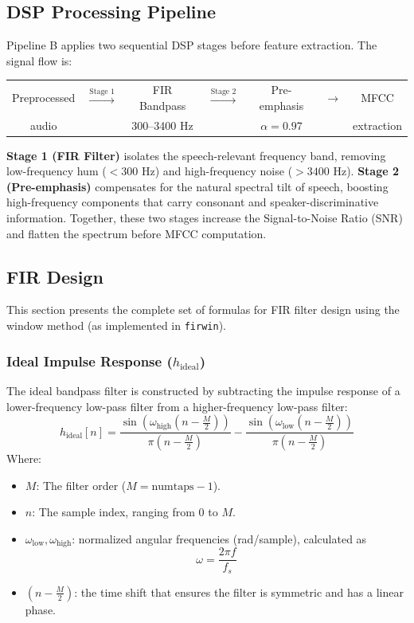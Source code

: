 
\subsection{DSP Processing Pipeline}

Pipeline B applies two sequential DSP stages before feature extraction. The signal flow is:

\begin{center}
\begin{tabular}{ccccccc}
Preprocessed & $\xrightarrow{\text{Stage 1}}$ & FIR Bandpass & $\xrightarrow{\text{Stage 2}}$ & Pre-emphasis & $\xrightarrow{}$ & MFCC \\
audio & & 300--3400 Hz & & $\alpha = 0.97$ & & extraction \\
\end{tabular}
\end{center}

\noindent \textbf{Stage 1 (FIR Filter)} isolates the speech-relevant frequency band, removing low-frequency hum ($<300$ Hz) and high-frequency noise ($>3400$ Hz). \textbf{Stage 2 (Pre-emphasis)} compensates for the natural spectral tilt of speech, boosting high-frequency components that carry consonant and speaker-discriminative information. Together, these two stages increase the Signal-to-Noise Ratio (SNR) and flatten the spectrum before MFCC computation.

\subsection{FIR Design}

This section presents the complete set of formulas for FIR filter design using the window method (as implemented in \texttt{firwin}).

\subsubsection{Ideal Impulse Response ($h_{\text{ideal}}$)}
The ideal bandpass filter is constructed by subtracting the impulse response of a lower-frequency low-pass filter from a higher-frequency low-pass filter:
\begin{equation}
h_{\text{ideal}}[n] = \frac{\sin\left(\omega_{\text{high}} \left(n - \frac{M}{2}\right)\right)}{\pi \left(n - \frac{M}{2}\right)} - \frac{\sin\left(\omega_{\text{low}} \left(n - \frac{M}{2}\right)\right)}{\pi \left(n - \frac{M}{2}\right)}
\end{equation}
Where:
\begin{itemize}
  \item $M$: The filter order ($M = \text{numtaps} - 1$).
  \item $n$: The sample index, ranging from $0$ to $M$.
  \item $\omega_{\text{low}}, \omega_{\text{high}}$: normalized angular frequencies (rad/sample), calculated as
  \begin{equation}
  \omega = \frac{2\pi f}{f_s}
  \end{equation}
  \item $\left(n - \frac{M}{2}\right)$: the time shift that ensures the filter is symmetric and has a linear phase.
\end{itemize}


